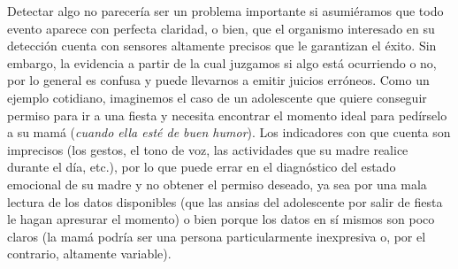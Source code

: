 Detectar algo no parecería ser un problema importante si asumiéramos que todo evento aparece con perfecta claridad, o bien, que el organismo interesado en su detección cuenta con sensores altamente precisos que le garantizan el éxito. Sin embargo, la evidencia a partir de la cual juzgamos si algo está ocurriendo o no, por lo general es confusa y puede llevarnos a emitir juicios erróneos. Como un ejemplo cotidiano, imaginemos el caso de un adolescente que quiere conseguir permiso para ir a una fiesta y necesita encontrar el momento ideal para pedírselo a su mamá (\textit{cuando ella esté de buen humor}). Los indicadores con que cuenta son imprecisos (los gestos, el tono de voz, las actividades que su madre realice durante el día, etc.), por lo que puede errar en el diagnóstico del estado emocional de su madre y no obtener el permiso deseado, ya sea por una mala lectura de los datos disponibles (que las ansias del adolescente por salir de fiesta le hagan apresurar el momento) o bien porque los datos en sí mismos son poco claros (la mamá podría ser una persona particularmente inexpresiva o, por el contrario, altamente variable).\\ 


